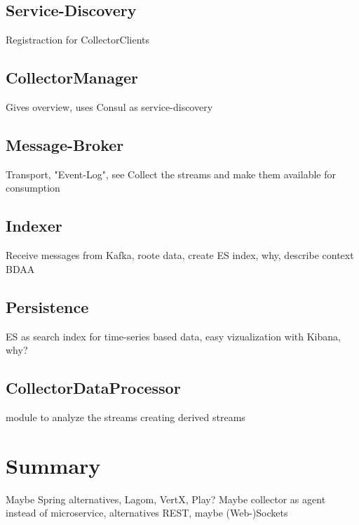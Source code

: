 \subsection{Service-Discovery}

Registraction for CollectorClients

\subsection{CollectorManager}

Gives overview, uses Consul as service-discovery

\subsection{Message-Broker}

Transport, "Event-Log", see \cite{Kreps13}
Collect the streams and make them available for consumption

\subsection{Indexer}

Receive messages from Kafka, roote data, create ES index, why, describe context BDAA

\subsection{Persistence}

ES as search index for time-series based data, easy vizualization with Kibana, why?

\subsection{CollectorDataProcessor}

module to analyze the streams creating derived streams

\section{Summary}

Maybe Spring alternatives, Lagom, VertX, Play?
Maybe collector as agent instead of microservice, alternatives REST, maybe (Web-)Sockets

